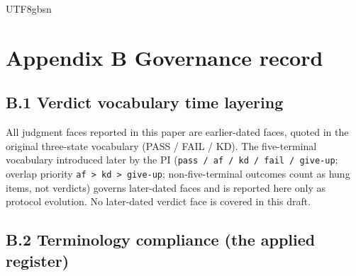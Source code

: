 \documentclass[11pt,letterpaper]{article}
\begin{document}
\begin{CJK}{UTF8}{gbsn}
\section*{Appendix B \textemdash{} Governance record}

\subsection*{B.1 Verdict vocabulary time layering}

All judgment faces reported in this paper are earlier-dated faces, quoted in the original three-state vocabulary (PASS / FAIL / KD). The five-terminal vocabulary introduced later by the PI (\texttt{pass / af / kd / fail / give-up}; overlap priority \texttt{af > kd > give-up}; non-five-terminal outcomes count as hung items, not verdicts) governs later-dated faces and is reported here only as protocol evolution. No later-dated verdict face is covered in this draft.

\subsection*{B.2 Terminology compliance (the applied register)}


\end{CJK}
\end{document}
